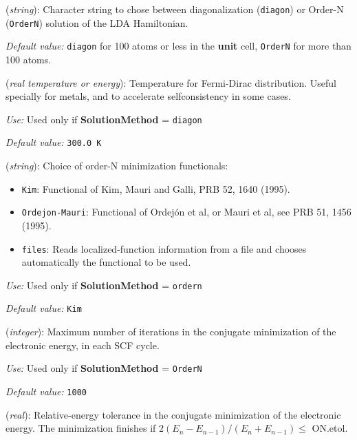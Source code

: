 \documentclass[11pt]{article}
\begin{document}
\begin{description}
\itemsep 10pt
\parsep 0pt

\item[{\bf SolutionMethod}] ({\it string}): 
Character string to chose between
diagonalization ({\tt diagon}) or Order-N ({\tt OrderN}) solution
of the LDA Hamiltonian.

{\it Default value:} {\tt diagon} for 100 atoms or less in the 
{\bf unit} cell, {\tt OrderN} for more than 100 atoms.

\item[{\bf ElectronicTemperature}] ({\it real temperature or energy}): 
Temperature for Fermi-Dirac distribution. Useful specially for
metals, and to accelerate selfconsistency in some cases.

{\it Use:} Used only if {\bf SolutionMethod} = {\tt diagon}

{\it Default value:} {\tt 300.0 K}


\item[{\bf ON.functional}] ({\it string}): 
Choice of order-N minimization functionals: 
\begin{itemize}
\item {\tt Kim}: 
Functional of Kim, Mauri and Galli, PRB 52, 1640 (1995).
\item {\tt Ordejon-Mauri}: 
Functional of Ordej\'on et al, or Mauri et al, see PRB 51, 1456 (1995).
\item {\tt files}: 
Reads localized-function information from a file and 
chooses automatically the functional to be used. 
\end{itemize}

{\it Use:} Used only if {\bf SolutionMethod} = {\tt ordern}

{\it Default value:} {\tt Kim}

\item[{\bf ON.MaxNumIter}] ({\it integer}): 
Maximum number of iterations
in the conjugate minimization of the electronic
energy, in each SCF cycle.

{\it Use:} Used only if {\bf SolutionMethod} = {\tt OrderN}

{\it Default value:} {\tt 1000}

\item[{\bf ON.etol}] ({\it real}): 
Relative-energy tolerance in the conjugate minimization of the electronic
energy. The minimization finishes if 
\hspace{0.2truecm} $2 (E_n - E_{n-1}) / (E_n + E_{n-1}) \leq $ ON.etol.


\end{description}
\end{document}
